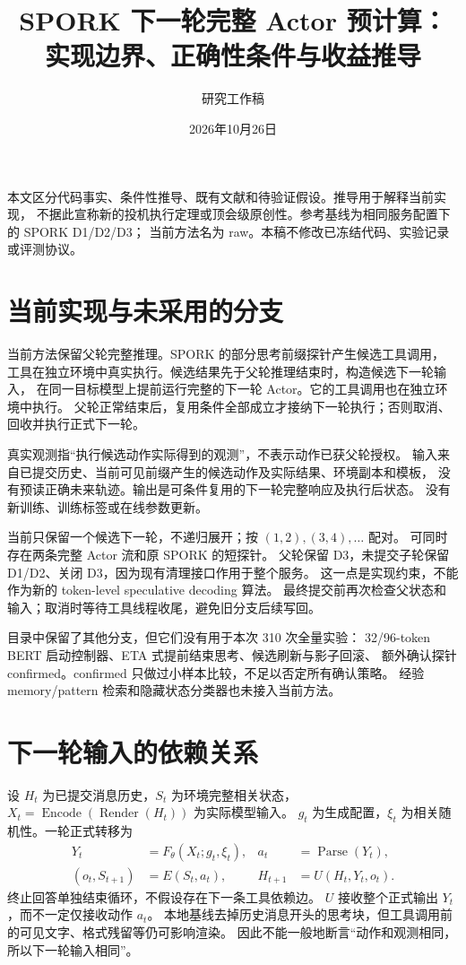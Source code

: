 \documentclass[UTF8,11pt]{ctexart}
\title{SPORK 下一轮完整 Actor 预计算：实现边界、正确性条件与收益推导}
\author{研究工作稿}
\date{2026年10月26日}
\begin{document}
\maketitle

本文区分代码事实、条件性推导、既有文献和待验证假设。推导用于解释当前实现，
不据此宣称新的投机执行定理或顶会级原创性。参考基线为相同服务配置下的 SPORK D1/D2/D3；
当前方法名为 raw。本稿不修改已冻结代码、实验记录或评测协议。

\section{当前实现与未采用的分支}
当前方法保留父轮完整推理。SPORK 的部分思考前缀探针产生候选工具调用，
工具在独立环境中真实执行。候选结果先于父轮推理结束时，构造候选下一轮输入，
在同一目标模型上提前运行完整的下一轮 Actor。它的工具调用也在独立环境中执行。
父轮正常结束后，复用条件全部成立才接纳下一轮执行；否则取消、回收并执行正式下一轮。

真实观测指“执行候选动作实际得到的观测”，不表示动作已获父轮授权。
输入来自已提交历史、当前可见前缀产生的候选动作及实际结果、环境副本和模板，
没有预读正确未来轨迹。输出是可条件复用的下一轮完整响应及执行后状态。
没有新训练、训练标签或在线参数更新。

当前只保留一个候选下一轮，不递归展开；按 $(1,2),(3,4),\ldots$ 配对。
可同时存在两条完整 Actor 流和原 SPORK 的短探针。
父轮保留 D3，未提交子轮保留 D1/D2、关闭 D3，因为现有清理接口作用于整个服务。
这一点是实现约束，不能作为新的 token-level speculative decoding 算法。
最终提交前再次检查父状态和输入；取消时等待工具线程收尾，避免旧分支后续写回。

目录中保留了其他分支，但它们没有用于本次 310 次全量实验：
32/96-token BERT 启动控制器、ETA 式提前结束思考、候选刷新与影子回滚、
额外确认探针 confirmed。confirmed 只做过小样本比较，不足以否定所有确认策略。
经验 memory/pattern 检索和隐藏状态分类器也未接入当前方法。

\section{下一轮输入的依赖关系}
设 $H_t$ 为已提交消息历史，$S_t$ 为环境完整相关状态，
$X_t=\operatorname{Encode}(\operatorname{Render}(H_t))$ 为实际模型输入。
$g_t$ 为生成配置，$\xi_t$ 为相关随机性。一轮正式转移为
\begin{align}
Y_t &= F_\theta(X_t;g_t,\xi_t), & a_t &= \operatorname{Parse}(Y_t),\\
(o_t,S_{t+1}) &= E(S_t,a_t), & H_{t+1} &= U(H_t,Y_t,o_t).
\end{align}
终止回答单独结束循环，不假设存在下一条工具依赖边。
$U$ 接收整个正式输出 $Y_t$，而不一定仅接收动作 $a_t$。
本地基线去掉历史消息开头的思考块，但工具调用前的可见文字、格式残留等仍可影响渲染。
因此不能一般地断言“动作和观测相同，所以下一轮输入相同”。
\end{document}
